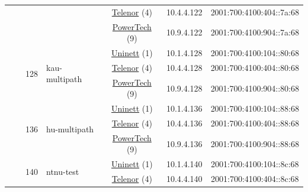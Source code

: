 \begin{small}
\begin{center}
\begin{longtable}{|c|c|c|c|c|c|c|c|}
  &  &  &  & \multicolumn{2}{|c|}{\tiny{\href{https://www.telenor.no}{Telenor} (4)}} & \tiny{10.4.4.122} & \tiny{2001:700:4100:404::7a:68} \\* \cline{5-5}\cline{6-6}\cline{7-7}\cline{8-8}
  &  &  &  & \multicolumn{2}{|c|}{\tiny{\href{http://www.powertech.no}{PowerTech} (9)}} & \tiny{10.9.4.122} & \tiny{2001:700:4100:904::7a:68} \\* \cline{3-3}\cline{4-4}\cline{5-5}\cline{6-6}\cline{7-7}\cline{8-8}
  &  & \multirow{3}{*}{\tiny{128}} & \multicolumn{1}{|l|}{\multirow{3}{*}{\tiny{kau-multipath}}} & \multicolumn{2}{|c|}{\tiny{\href{https://www.uninett.no}{Uninett} (1)}} & \tiny{10.1.4.128} & \tiny{2001:700:4100:104::80:68} \\* \cline{5-5}\cline{6-6}\cline{7-7}\cline{8-8}
  &  &  &  & \multicolumn{2}{|c|}{\tiny{\href{https://www.telenor.no}{Telenor} (4)}} & \tiny{10.4.4.128} & \tiny{2001:700:4100:404::80:68} \\* \cline{5-5}\cline{6-6}\cline{7-7}\cline{8-8}
  &  &  &  & \multicolumn{2}{|c|}{\tiny{\href{http://www.powertech.no}{PowerTech} (9)}} & \tiny{10.9.4.128} & \tiny{2001:700:4100:904::80:68} \\* \cline{3-3}\cline{4-4}\cline{5-5}\cline{6-6}\cline{7-7}\cline{8-8}
  &  & \multirow{3}{*}{\tiny{136}} & \multicolumn{1}{|l|}{\multirow{3}{*}{\tiny{hu-multipath}}} & \multicolumn{2}{|c|}{\tiny{\href{https://www.uninett.no}{Uninett} (1)}} & \tiny{10.1.4.136} & \tiny{2001:700:4100:104::88:68} \\* \cline{5-5}\cline{6-6}\cline{7-7}\cline{8-8}
  &  &  &  & \multicolumn{2}{|c|}{\tiny{\href{https://www.telenor.no}{Telenor} (4)}} & \tiny{10.4.4.136} & \tiny{2001:700:4100:404::88:68} \\* \cline{5-5}\cline{6-6}\cline{7-7}\cline{8-8}
  &  &  &  & \multicolumn{2}{|c|}{\tiny{\href{http://www.powertech.no}{PowerTech} (9)}} & \tiny{10.9.4.136} & \tiny{2001:700:4100:904::88:68} \\* \cline{3-3}\cline{4-4}\cline{5-5}\cline{6-6}\cline{7-7}\cline{8-8}
  &  & \multirow{3}{*}{\tiny{140}} & \multicolumn{1}{|l|}{\multirow{3}{*}{\tiny{ntnu-test}}} & \multicolumn{2}{|c|}{\tiny{\href{https://www.uninett.no}{Uninett} (1)}} & \tiny{10.1.4.140} & \tiny{2001:700:4100:104::8c:68} \\* \cline{5-5}\cline{6-6}\cline{7-7}\cline{8-8}
  &  &  &  & \multicolumn{2}{|c|}{\tiny{\href{https://www.telenor.no}{Telenor} (4)}} & \tiny{10.4.4.140} & \tiny{2001:700:4100:404::8c:68} \\* \cline{5-5}\cline{6-6}\cline{7-7}\cline{8-8}

\end{longtable}
\end{center}
\end{small}
